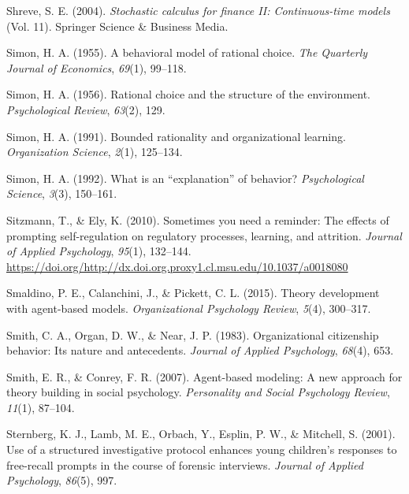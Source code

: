 \documentclass[english,,man]{apa6}
\begin{document}
\leavevmode\hypertarget{ref-shreve_stochastic_2004}{}%
Shreve, S. E. (2004). \emph{Stochastic calculus for finance II: Continuous-time models} (Vol. 11). Springer Science \& Business Media.

\leavevmode\hypertarget{ref-simon_behavioral_1955}{}%
Simon, H. A. (1955). A behavioral model of rational choice. \emph{The Quarterly Journal of Economics}, \emph{69}(1), 99--118.

\leavevmode\hypertarget{ref-simon_rational_1956}{}%
Simon, H. A. (1956). Rational choice and the structure of the environment. \emph{Psychological Review}, \emph{63}(2), 129.

\leavevmode\hypertarget{ref-simon_bounded_1991}{}%
Simon, H. A. (1991). Bounded rationality and organizational learning. \emph{Organization Science}, \emph{2}(1), 125--134.

\leavevmode\hypertarget{ref-simon_what_1992}{}%
Simon, H. A. (1992). What is an ``explanation'' of behavior? \emph{Psychological Science}, \emph{3}(3), 150--161.

\leavevmode\hypertarget{ref-sitzmann_sometimes_2010}{}%
Sitzmann, T., \& Ely, K. (2010). Sometimes you need a reminder: The effects of prompting self-regulation on regulatory processes, learning, and attrition. \emph{Journal of Applied Psychology}, \emph{95}(1), 132--144. \url{https://doi.org/http://dx.doi.org.proxy1.cl.msu.edu/10.1037/a0018080}

\leavevmode\hypertarget{ref-smaldino2015theory}{}%
Smaldino, P. E., Calanchini, J., \& Pickett, C. L. (2015). Theory development with agent-based models. \emph{Organizational Psychology Review}, \emph{5}(4), 300--317.

\leavevmode\hypertarget{ref-smith_organizational_1983}{}%
Smith, C. A., Organ, D. W., \& Near, J. P. (1983). Organizational citizenship behavior: Its nature and antecedents. \emph{Journal of Applied Psychology}, \emph{68}(4), 653.

\leavevmode\hypertarget{ref-smith2007agent}{}%
Smith, E. R., \& Conrey, F. R. (2007). Agent-based modeling: A new approach for theory building in social psychology. \emph{Personality and Social Psychology Review}, \emph{11}(1), 87--104.

\leavevmode\hypertarget{ref-sternberg_use_2001}{}%
Sternberg, K. J., Lamb, M. E., Orbach, Y., Esplin, P. W., \& Mitchell, S. (2001). Use of a structured investigative protocol enhances young children's responses to free-recall prompts in the course of forensic interviews. \emph{Journal of Applied Psychology}, \emph{86}(5), 997.
\end{document}
